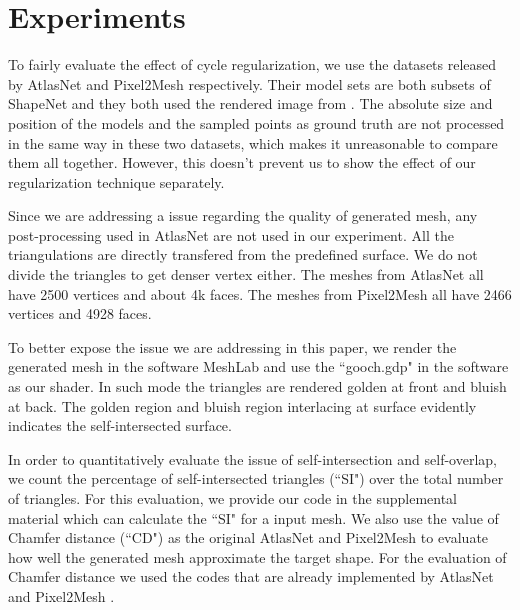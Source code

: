 \section{Experiments}
 To fairly evaluate the effect of cycle regularization, we use the datasets released by AtlasNet and Pixel2Mesh respectively. Their model sets are both subsets of ShapeNet \cite{shapenetdata} and they both used the rendered image from \cite{3DR2N2}. The absolute size and position of the models and the sampled points as ground truth are not processed in the same way in these two datasets, which makes it unreasonable to compare them all together. However, this doesn't prevent us to show the effect of our regularization technique separately.

 Since we are addressing a issue regarding the quality of generated mesh, any post-processing used in AtlasNet \cite{atlasnet} are not used in our experiment. All the triangulations are directly transfered from the predefined surface. We do not divide the triangles to get denser vertex either. The meshes from AtlasNet all have 2500 vertices and about 4k faces. The meshes from Pixel2Mesh all have 2466 vertices and 4928 faces.

To better expose the issue we are addressing in this paper, we render the generated mesh in the software MeshLab and use the ``gooch.gdp" in the software as our shader. In such mode the triangles are rendered golden at front and bluish at back. The golden region and bluish region interlacing at surface evidently indicates the self-intersected surface.

In order to quantitatively evaluate the issue of self-intersection and self-overlap, we count the percentage of self-intersected triangles (``SI") over the total number of triangles. For this evaluation, we provide our code in the supplemental material which can calculate the ``SI" for a input mesh.  
We also use the value of Chamfer distance (``CD") as the original AtlasNet and Pixel2Mesh to evaluate how well the generated mesh approximate the target shape. For the evaluation of Chamfer distance we used the codes that are already implemented by AtlasNet \cite{atlasnet} and Pixel2Mesh \cite{pixel2mesh}.

